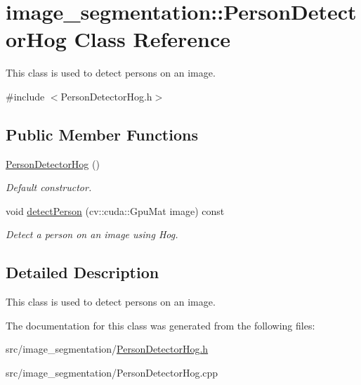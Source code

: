 \hypertarget{classimage__segmentation_1_1_person_detector_hog}{}\section{image\+\_\+segmentation\+:\+:Person\+Detector\+Hog Class Reference}
\label{classimage__segmentation_1_1_person_detector_hog}


This class is used to detect persons on an image.  




{\ttfamily \#include $<$Person\+Detector\+Hog.\+h$>$}

\subsection*{Public Member Functions}
\begin{DoxyCompactItemize}
\item 
\mbox{\label{classimage__segmentation_1_1_person_detector_hog_aa634e3f5e437a1b4f38e68df75dd1480}} 
\mbox{\hyperlink{classimage__segmentation_1_1_person_detector_hog_aa634e3f5e437a1b4f38e68df75dd1480}{Person\+Detector\+Hog}} ()
\begin{DoxyCompactList}\small\item\em Default constructor. \end{DoxyCompactList}\item 
\mbox{\label{classimage__segmentation_1_1_person_detector_hog_a6bff7ed2dbb67c12b1a689a779e31aff}} 
void \mbox{\hyperlink{classimage__segmentation_1_1_person_detector_hog_a6bff7ed2dbb67c12b1a689a779e31aff}{detect\+Person}} (cv\+::cuda\+::\+Gpu\+Mat image) const
\begin{DoxyCompactList}\small\item\em Detect a person on an image using Hog. \end{DoxyCompactList}\end{DoxyCompactItemize}


\subsection{Detailed Description}
This class is used to detect persons on an image. 

The documentation for this class was generated from the following files\+:\begin{DoxyCompactItemize}
\item 
src/image\+\_\+segmentation/\mbox{\hyperlink{_person_detector_hog_8h}{Person\+Detector\+Hog.\+h}}\item 
src/image\+\_\+segmentation/Person\+Detector\+Hog.\+cpp\end{DoxyCompactItemize}
